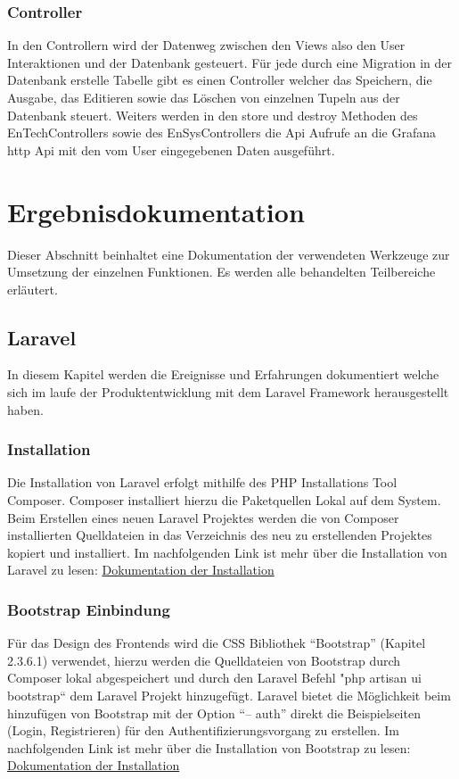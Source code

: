 \subsection{Controller}
In den Controllern wird der Datenweg zwischen den Views also den User Interaktionen und der Datenbank gesteuert. Für jede durch eine Migration in der Datenbank erstelle Tabelle gibt es einen Controller welcher das Speichern, die Ausgabe, das Editieren sowie das Löschen von einzelnen Tupeln aus der Datenbank steuert. Weiters werden in den store und destroy Methoden des EnTechControllers sowie des EnSysControllers die Api Aufrufe an die Grafana http Api mit den vom User eingegebenen Daten ausgeführt.

\chapter{Ergebnisdokumentation }
Dieser Abschnitt beinhaltet eine Dokumentation der verwendeten Werkzeuge zur Umsetzung der einzelnen Funktionen. Es werden alle behandelten Teilbereiche erläutert.

\section{Laravel }
In diesem Kapitel werden die Ereignisse und Erfahrungen dokumentiert welche sich im laufe der Produktentwicklung mit dem Laravel Framework herausgestellt haben.

\subsection{Installation}
Die Installation von Laravel erfolgt mithilfe des PHP Installations Tool Composer. Composer installiert hierzu die Paketquellen Lokal auf dem System. Beim Erstellen eines neuen Laravel Projektes werden die von Composer installierten Quelldateien in das Verzeichnis des neu zu erstellenden Projektes kopiert und installiert. Im nachfolgenden Link ist mehr über die Installation von Laravel zu lesen:
\href{https://laravel.com/docs/9.x#installation-via-composer}{Dokumentation der Installation}


\subsection{Bootstrap Einbindung}
Für das Design des Frontends wird die CSS Bibliothek “Bootstrap” (Kapitel 2.3.6.1) verwendet, hierzu werden die Quelldateien von Bootstrap durch Composer lokal abgespeichert und durch den Laravel Befehl "php artisan ui bootstrap“ dem Laravel Projekt hinzugefügt. Laravel bietet die Möglichkeit beim hinzufügen von Bootstrap mit der Option “-- auth” direkt die Beispielseiten (Login, Registrieren) für den Authentifizierungsvorgang zu erstellen. Im nachfolgenden Link ist mehr über die Installation von Bootstrap zu lesen:
\href{https://www.positronx.io/how-to-properly-install-and-use-bootstrap-in-laravel/}{Dokumentation der Installation}


